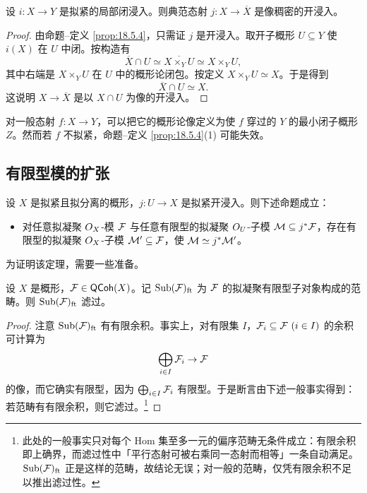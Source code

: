 \begin{lemma}\label{lem:18.5.5}
设 $i:X\to Y$ 是拟紧的局部闭浸入。则典范态射 $j:X\to\overline{X}$ 是像稠密的开浸入。
\end{lemma}

\begin{proof}
由命题--定义 \ref{prop:18.5.4}，只需证 $j$ 是开浸入。取开子概形 $U\subseteq Y$ 使 $i(X)$ 在 $U$ 中闭。按构造有
\[
\overline{X}\cap U\simeq\overline{X\times_Y U}\simeq X\times_Y U,
\]
其中右端是 $X\times_Y U$ 在 $U$ 中的概形论闭包。按定义 $X\times_Y U\simeq X$。于是得到
\[
\overline{X}\cap U\simeq X.
\]
这说明 $X\to\overline{X}$ 是以 $X\cap U$ 为像的开浸入。
\end{proof}

\begin{warning}\label{warn:18.5.6}
对一般态射 $f:X\to Y$，可以把它的概形论像定义为使 $f$ 穿过的 $Y$ 的最小闭子概形 $Z$。然而若 $f$ 不拟紧，命题--定义 \ref{prop:18.5.4}(1) 可能失效。
\end{warning}

\subsection{有限型模的扩张}\label{sec:18.6}

\begin{theorem}\label{thm:18.6.1}
设 $X$ 是拟紧且拟分离的概形，$j:U\to X$ 是拟紧开浸入。则下述命题成立：
\begin{itemize}[leftmargin=1.5em,itemsep=0.15ex]
  \item[(*)] 对任意拟凝聚 $O_X$-模 $\mathcal{F}$ 与任意有限型的拟凝聚 $O_U$-子模 $\mathcal{M}\subseteq j^*\mathcal{F}$，存在有限型的拟凝聚 $O_X$-子模 $\mathcal{M}'\subseteq\mathcal{F}$，使 $\mathcal{M}\simeq j^*\mathcal{M}'$。
\end{itemize}
\end{theorem}

为证明该定理，需要一些准备。

\begin{lemma}\label{lem:18.6.2}
设 $X$ 是概形，$\mathcal{F}\in\mathsf{QCoh}(X)$。记 $\mathrm{Sub}(\mathcal{F})_{\mathrm{ft}}$ 为 $\mathcal{F}$ 的拟凝聚有限型子对象构成的范畴。则 $\mathrm{Sub}(\mathcal{F})_{\mathrm{ft}}$ 滤过。
\end{lemma}

\begin{proof}
注意 $\mathrm{Sub}(\mathcal{F})_{\mathrm{ft}}$ 有有限余积。事实上，对有限集 $I$，$\mathcal{F}_i\subseteq\mathcal{F}\ (i\in I)$ 的余积可计算为
\[
\bigoplus_{i\in I}\mathcal{F}_i\to\mathcal{F}
\]
的像，而它确实有限型，因为 $\bigoplus_{i\in I}\mathcal{F}_i$ 有限型。于是断言由下述一般事实得到：若范畴有有限余积，则它滤过。\footnote{此处的一般事实只对每个 $\mathrm{Hom}$ 集至多一元的偏序范畴无条件成立：有限余积即上确界，而滤过性中「平行态射可被右乘同一态射而相等」一条自动满足。$\mathrm{Sub}(\mathcal{F})_{\mathrm{ft}}$ 正是这样的范畴，故结论无误；对一般的范畴，仅凭有限余积不足以推出滤过性。}
\end{proof}

